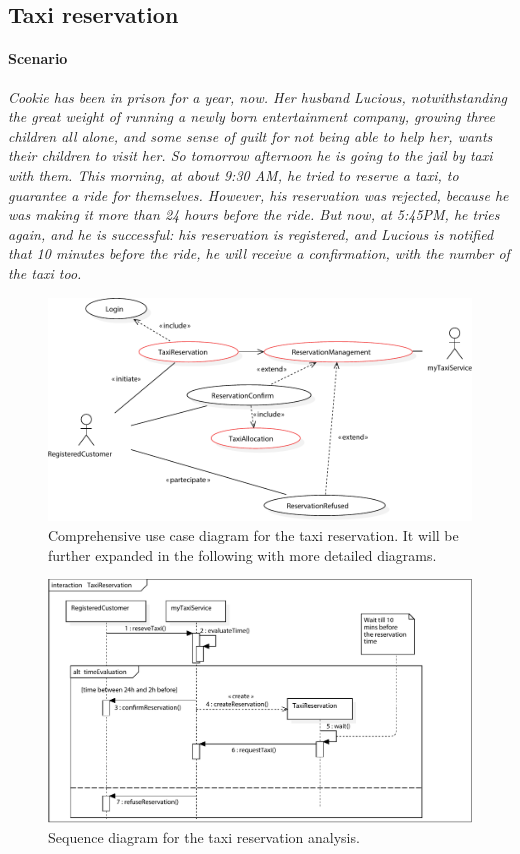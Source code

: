\subsection{Taxi reservation}\label{subsec:taxiReservation}


\paragraph{Scenario}{\small\itshape Cookie has been in prison for a year, now. Her husband Lucious, notwithstanding the great weight of running a newly born entertainment company, growing three children all alone, and some sense of guilt for not being able to help her, wants their children to visit her. So tomorrow afternoon he is going to the jail by taxi with them. This morning, at about 9:30 AM, he tried to reserve a taxi, to guarantee a ride for themselves. However, his reservation was rejected, because he was making it more than \num{24} hours before the ride. But now, at 5:45PM, he tries again, and he is successful: his reservation is registered, and Lucious is notified that \num{10} minutes before the ride, he will receive a confirmation, with the number of the taxi too.}


\begin{figure}
	\includegraphics[width=\linewidth]{img/U_TaxiReservationGLOBAL}
	\caption{Comprehensive use case diagram for the taxi reservation. It will be further expanded in the following with more detailed diagrams.}
\end{figure}


\begin{figure}
	\includegraphics[width=\linewidth]{img/S_TaxiReservation}
	\caption{Sequence diagram for the taxi reservation analysis.}
\end{figure}	


